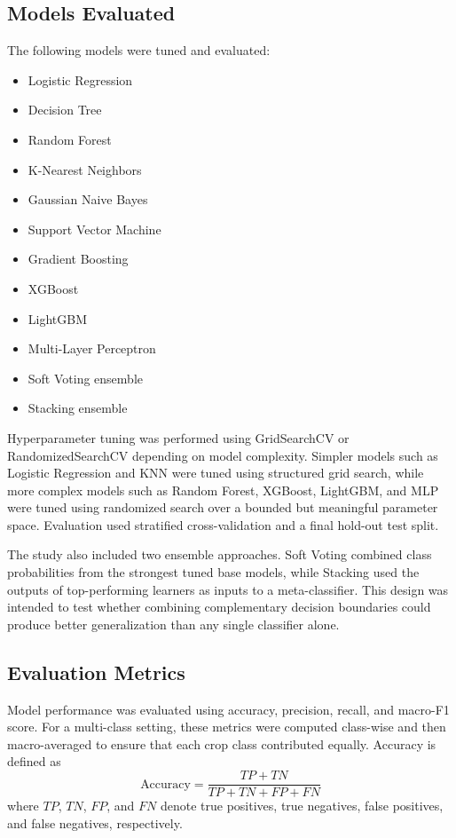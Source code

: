 \documentclass[conference]{IEEEtran}
\begin{document}
\subsection{Models Evaluated}
The following models were tuned and evaluated:
\begin{itemize}
    \item Logistic Regression
    \item Decision Tree
    \item Random Forest
    \item K-Nearest Neighbors
    \item Gaussian Naive Bayes
    \item Support Vector Machine
    \item Gradient Boosting
    \item XGBoost
    \item LightGBM
    \item Multi-Layer Perceptron
    \item Soft Voting ensemble
    \item Stacking ensemble
\end{itemize}

Hyperparameter tuning was performed using GridSearchCV or RandomizedSearchCV depending on model complexity. Simpler models such as Logistic Regression and KNN were tuned using structured grid search, while more complex models such as Random Forest, XGBoost, LightGBM, and MLP were tuned using randomized search over a bounded but meaningful parameter space. Evaluation used stratified cross-validation and a final hold-out test split.

The study also included two ensemble approaches. Soft Voting combined class probabilities from the strongest tuned base models, while Stacking used the outputs of top-performing learners as inputs to a meta-classifier. This design was intended to test whether combining complementary decision boundaries could produce better generalization than any single classifier alone.

\subsection{Evaluation Metrics}
Model performance was evaluated using accuracy, precision, recall, and macro-F1 score. For a multi-class setting, these metrics were computed class-wise and then macro-averaged to ensure that each crop class contributed equally. Accuracy is defined as
\begin{equation}
\text{Accuracy} = \frac{TP + TN}{TP + TN + FP + FN}
\end{equation}
where $TP$, $TN$, $FP$, and $FN$ denote true positives, true negatives, false positives, and false negatives, respectively.
\end{document}
